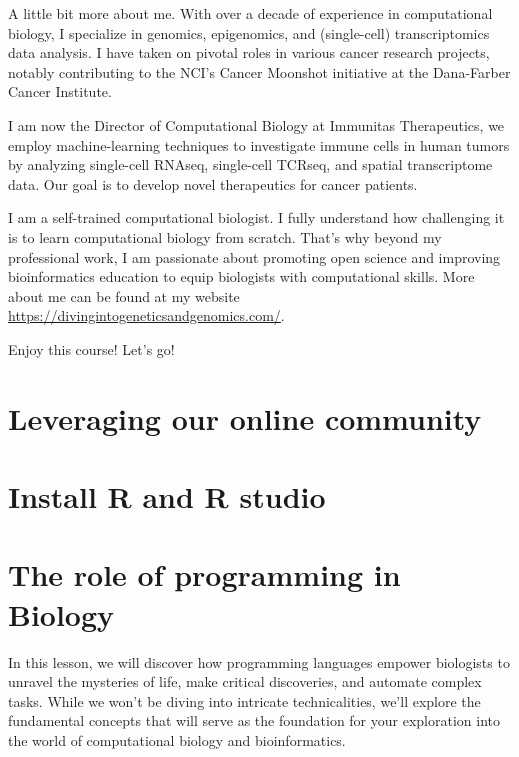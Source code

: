 \documentclass[
]{book}
\begin{document}
A little bit more about me. With over a decade of experience in computational biology, I specialize in genomics, epigenomics, and (single-cell) transcriptomics data analysis. I have taken on pivotal roles in various cancer research projects, notably contributing to the NCI's Cancer Moonshot initiative at the Dana-Farber Cancer Institute.

I am now the Director of Computational Biology at Immunitas Therapeutics, we employ machine-learning techniques to investigate immune cells in human tumors by analyzing single-cell RNAseq, single-cell TCRseq, and spatial transcriptome data. Our goal is to develop novel therapeutics for cancer patients.

I am a self-trained computational biologist. I fully understand how challenging it is to learn computational biology from scratch. That's why beyond my professional work, I am passionate about promoting open science and improving bioinformatics education to equip biologists with computational skills. More about me can be found at my website \url{https://divingintogeneticsandgenomics.com/}.

Enjoy this course! Let's go!

\hypertarget{leveraging-our-online-community}{%
\section{Leveraging our online community}\label{leveraging-our-online-community}}

\hypertarget{install-r-and-r-studio}{%
\section{Install R and R studio}\label{install-r-and-r-studio}}

\hypertarget{the-role-of-programming-in-biology}{%
\section{The role of programming in Biology}\label{the-role-of-programming-in-biology}}

In this lesson, we will discover how programming languages empower biologists to unravel the mysteries of life, make critical discoveries, and automate complex tasks. While we won't be diving into intricate technicalities, we'll explore the fundamental concepts that will serve as the foundation for your exploration into the world of computational biology and bioinformatics.
\end{document}
